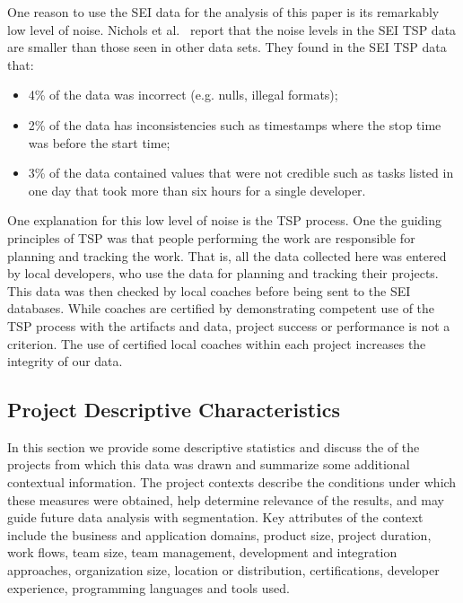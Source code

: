 \documentclass[smallcondensed]{svjour3}
\newcommand{\todo}[1]{\textcolor{Maroon}{TODO: #1}}
\newcommand{\bi}{\begin{itemize}}%
\newcommand{\ei}{\end{itemize}}
\begin{document}
One reason to use the SEI data for the analysis of this paper is its remarkably low level of noise.
Nichols et al.~\cite{shirai14}  report that
the noise levels in the SEI TSP data are smaller than those seen
in other data sets. They found in the SEI TSP data that:\bi 
\item
4\% of the data was incorrect (e.g. nulls, illegal formats);
\item  2\% of the data has inconsistencies such as timestamps
where the stop time was before the start time;
\item 3\% of the data contained values that were not credible
such as tasks listed in one day that took more than six hours for a single developer.
\ei 
One explanation for this low level of noise is the TSP process.
One the guiding principles of TSP was that  people performing the work are  responsible for planning and tracking the work. That is,  all the data collected here was entered
by local developers, who use the data for planning and tracking their projects. This data was then checked by local coaches before being sent to the SEI
databases. While coaches are certified by demonstrating competent use of the TSP process with the artifacts and data,  project success or performance is not a criterion. 
The use of certified local coaches within each project increases the integrity of our data.


 

\subsection{Project Descriptive Characteristics}
\label{sect:data_character}

In this section we provide some descriptive statistics and discuss the of the projects from which this data was drawn and summarize some additional contextual information. The project contexts describe the conditions under which these measures were obtained, help determine relevance of the results, and may guide future data analysis with segmentation. Key attributes of the context include the business and application domains, product size, project duration,  work flows, team size, team management,  development and integration approaches, organization size, location or distribution, certifications, developer experience, programming languages and tools used. 
\end{document}
